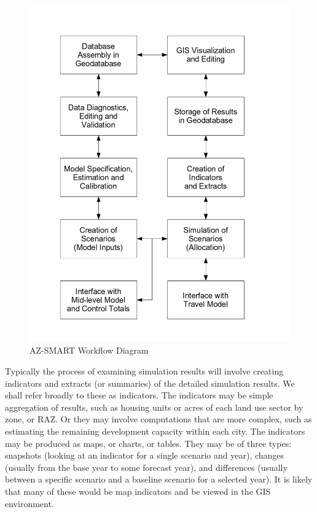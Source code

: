 \begin{figure}[h]
\begin{center}
\includegraphics[scale=0.6]{figures/functional_diagram.png}
\caption{AZ-SMART Workflow Diagram} \label{figWorkflow}
\end{center}
\end{figure}


\clearpage

Typically the process of examining simulation results will involve
creating indicators and extracts (or summaries) of the detailed
simulation results.  We shall refer broadly to these as indicators.
The indicators may be simple aggregation of results, such as housing
units or acres of each land use sector by zone, or RAZ.  Or they may
involve computations that are more complex, such as estimating the
remaining development capacity within each city.  The indicators may
be produced as maps, or charts, or tables. They may be of three
types: snapshots (looking at an indicator for a single scenario and
year), changes (usually from the base year to some forecast year),
and differences (usually between a specific scenario and a baseline
scenario for a selected year).  It is likely that many of these
would be map indicators and be viewed in the GIS environment.



